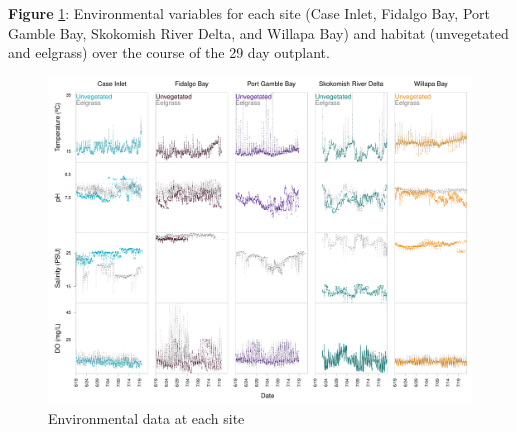 \documentclass [11pt, proquest] {uwthesis}[2015/03/03]
\begin{document}
\textbf{Figure} \ref{fig:envdatalines}: Environmental variables for each site (Case Inlet, Fidalgo Bay, Port Gamble Bay, Skokomish River Delta, and Willapa Bay) and habitat (unvegetated and eelgrass) over the course of the 29 day outplant.\newline
\begin{figure}[h]
\centering
  \includegraphics[width=1\textwidth]{figure/Ch1/fig1.2.pdf}
  \caption{Environmental data at each site}
  \label{fig:envdatalines}
\end{figure}
\clearpage
\end{document}
